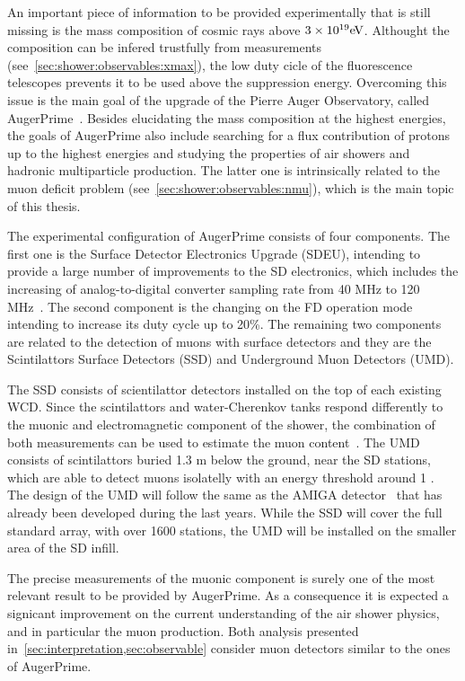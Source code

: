 An important piece of information to be provided experimentally that
is still missing is the mass composition of cosmic rays above $3 \times \mbox{$10^{19}$} \mbox{e\kern-0.1em V}$.
Althought the composition can be infered trustfully from \xmax measurements
(see~\cref{sec:shower:observables:xmax}),
the low duty cicle of the fluorescence telescopes prevents
it to be used above the suppression energy.
Overcoming this issue is the main goal of the upgrade of the Pierre Auger Observatory,
called AugerPrime~\cite{Aab:2016vlz,Martello:2017pch}.
Besides elucidating the mass composition at the highest energies,
the goals of AugerPrime also include searching for a flux contribution of protons up to the highest
energies and studying the properties of air showers and hadronic multiparticle production.
The latter one is intrinsically related
to the muon deficit problem (see~\cref{sec:shower:observables:nmu}),
which is the main topic of this thesis.

The experimental configuration of AugerPrime consists of four components.
The first one is the Surface Detector Electronics Upgrade (SDEU), intending to provide
a large number of improvements to the SD electronics, which includes the increasing of
analog-to-digital converter sampling rate from 40 MHz to 120 MHz~\cite{Suomijarvi:2017ixb}.
The second component is the changing
on the FD operation mode intending to increase its duty cycle up to 20\%.
The remaining two components are related to the detection of muons with surface detectors and
they are the Scintilattors Surface Detectors (SSD) and
Underground Muon Detectors (UMD).

The SSD consists of scientilattor detectors installed on the top of each existing WCD.
Since the scintilattors and water-Cherenkov tanks respond differently to the muonic and
electromagnetic component of the shower, the combination of both measurements
can be used to estimate the muon content~\cite{Gonzalez:2016ora}. 
The UMD consists of scintilattors buried 1.3 m below the ground, near the SD stations,
which are able to detect muons isolatelly with an energy threshold around 1 \GeV. The design
of the UMD will follow the same as the AMIGA detector~\cite{Suarez:2013ecb,Wundheiler:2011zz,Platino:2011zz}
that has already been developed during the last years. While the SSD will cover the full
standard array, with over 1600 stations, the UMD will be installed on the smaller area
of the SD infill.

The precise measurements of the muonic component is surely one of the most relevant
result to be provided by AugerPrime. As a consequence it is expected a signicant
improvement on the current understanding of the air shower physics, and in particular
the muon production. Both analysis presented in~\cref{sec:interpretation,sec:observable}
consider muon detectors similar to the ones of AugerPrime.


